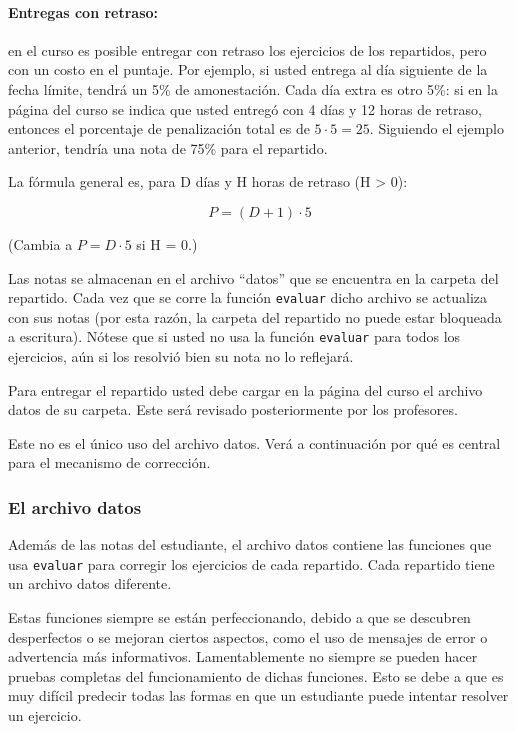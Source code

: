 \documentclass[]{article}
\begin{document}
\paragraph{Entregas con retraso:}

en el curso es posible entregar con retraso los ejercicios de los
repartidos, pero con un costo en el puntaje. Por ejemplo, si usted
entrega al día siguiente de la fecha límite, tendrá un 5\% de
amonestación. Cada día extra es otro 5\%: si en la página del curso se
indica que usted entregó con 4 días y 12 horas de retraso, entonces el
porcentaje de penalización total es de $5 \cdot 5 = 25$. Siguiendo el
ejemplo anterior, tendría una nota de 75\% para el repartido.

La fórmula general es, para D días y H horas de retraso (H
\textgreater{} 0):

\[
  P = (D + 1) \cdot 5
\]

(Cambia a $P = D \cdot 5$ si H = 0.)

Las notas se almacenan en el archivo ``datos'' que se encuentra en la
carpeta del repartido. Cada vez que se corre la función \texttt{evaluar}
dicho archivo se actualiza con sus notas (por esta razón, la carpeta del
repartido no puede estar bloqueada a escritura). Nótese que si usted no
usa la función \texttt{evaluar} para todos los ejercicios, aún si los
resolvió bien su nota no lo reflejará.

Para entregar el repartido usted debe cargar en la página del curso el
archivo datos de su carpeta. Este será revisado posteriormente por los
profesores.

Este no es el único uso del archivo datos. Verá a continuación por qué
es central para el mecanismo de corrección.

\subsubsection{El archivo datos}

Además de las notas del estudiante, el archivo datos contiene las
funciones que usa \texttt{evaluar} para corregir los ejercicios de cada
repartido. Cada repartido tiene un archivo datos diferente.

Estas funciones siempre se están perfeccionando, debido a que se
descubren desperfectos o se mejoran ciertos aspectos, como el uso de
mensajes de error o advertencia más informativos. Lamentablemente no
siempre se pueden hacer pruebas completas del funcionamiento de dichas
funciones. Esto se debe a que es muy difícil predecir todas las formas
en que un estudiante puede intentar resolver un ejercicio.
\end{document}

